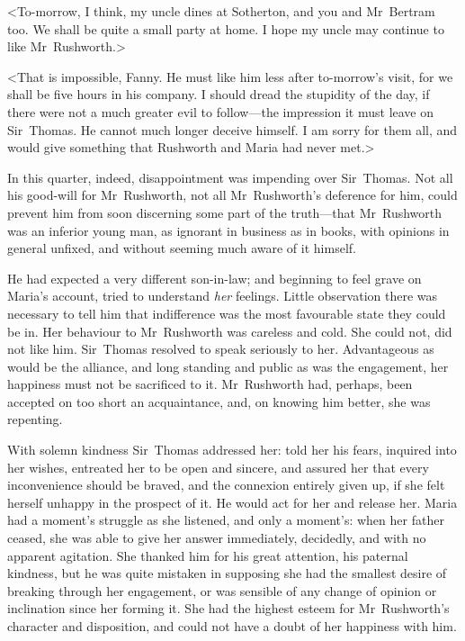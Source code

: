 <To-morrow, I think, my uncle dines at Sotherton, and you and Mr~Bertram too. We shall be quite a small party at home. I hope my uncle may continue to like Mr~Rushworth.>

<That is impossible, Fanny. He must like him less after to-morrow's visit, for we shall be five hours in his company. I should dread the stupidity of the day, if there were not a much greater evil to follow—the impression it must leave on Sir~Thomas. He cannot much longer deceive himself. I am sorry for them all, and would give something that Rushworth and Maria had never met.>

In this quarter, indeed, disappointment was impending over Sir~Thomas. Not all his good-will for Mr~Rushworth, not all Mr~Rushworth's deference for him, could prevent him from soon discerning some part of the truth—that Mr~Rushworth was an inferior young man, as ignorant in business as in books, with opinions in general unfixed, and without seeming much aware of it himself.

He had expected a very different son-in-law; and beginning to feel grave on Maria's account, tried to understand \textit{her}  feelings. Little observation there was necessary to tell him that indifference was the most favourable state they could be in. Her behaviour to Mr~Rushworth was careless and cold. She could not, did not like him. Sir~Thomas resolved to speak seriously to her. Advantageous as would be the alliance, and long standing and public as was the engagement, her happiness must not be sacrificed to it. Mr~Rushworth had, perhaps, been accepted on too short an acquaintance, and, on knowing him better, she was repenting.

With solemn kindness Sir~Thomas addressed her: told her his fears, inquired into her wishes, entreated her to be open and sincere, and assured her that every inconvenience should be braved, and the connexion entirely given up, if she felt herself unhappy in the prospect of it. He would act for her and release her. Maria had a moment's struggle as she listened, and only a moment's: when her father ceased, she was able to give her answer immediately, decidedly, and with no apparent agitation. She thanked him for his great attention, his paternal kindness, but he was quite mistaken in supposing she had the smallest desire of breaking through her engagement, or was sensible of any change of opinion or inclination since her forming it. She had the highest esteem for Mr~Rushworth's character and disposition, and could not have a doubt of her happiness with him.

